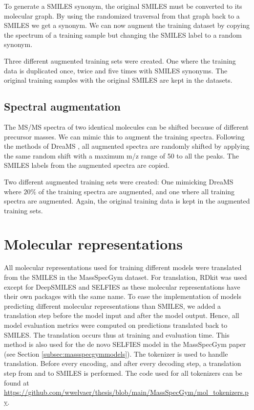To generate a SMILES synonym, the original SMILES must be converted to its molecular graph. 
By using the randomized traversal from that graph back to a SMILES we get a synonym.
We can now augment the training dataset by copying the spectrum of a training sample but changing the SMILES label to a random synonym.

Three different augmented training sets were created. One where the training data is duplicated once, twice and five times with SMILES synonyms.
The original training samples with the original SMILES are kept in the datasets.

\subsection{Spectral augmentation}

The \ac{MS/MS} spectra of two identical molecules can be shifted because of different precursor masses.
We can mimic this to augment the training spectra.
Following the methods of DreaMS \cite{bushuiev2024emergence}, all augmented spectra are randomly shifted by applying the same random shift with a maximum m/z range of 50 to all the peaks.
The SMILES labels from the augmented spectra are copied.

Two different augmented training sets were created:
One mimicking DreaMS where $20\%$ of the training spectra are augmented, and one where all training spectra are augmented.
Again, the original training data is kept in the augmented training sets.

\section{Molecular representations}
\label{sec:representations}

All molecular representations used for training different models were translated from the SMILES in the MassSpecGym dataset.
For translation, RDkit was used except for DeepSMILES and SELFIES as these molecular representations have their own packages with the same name.
To ease the implementation of models predicting different molecular representations than SMILES,
we added a translation step before the model input and after the model output.
Hence, all model evaluation metrics were computed on predictions translated back to SMILES.
The translation occurs thus at training and evaluation time.
This method is also used for the de novo SELFIES model in the MassSpecGym paper (see Section \ref{subsec:massspecgymmodels}).
The tokenizer is used to handle translation. Before every encoding, and after every decoding step, a translation step from and to SMILES is performed.
The code used for all tokenizers can be found at \url{https://github.com/wwelvaer/thesis/blob/main/MassSpecGym/mol_tokenizers.py}.

